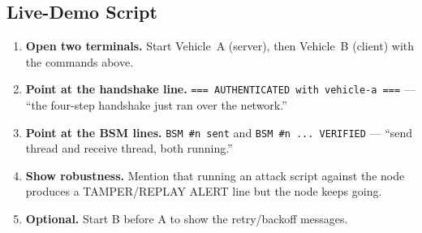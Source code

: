 \documentclass[11pt,a4paper]{article}
\begin{document}
\subsection{Live-Demo Script}
\begin{enumerate}
  \item \textbf{Open two terminals.} Start Vehicle~A (server), then Vehicle~B
        (client) with the commands above.
  \item \textbf{Point at the handshake line.} \texttt{=== AUTHENTICATED with
        vehicle-a ===} --- ``the four-step handshake just ran over the network.''
  \item \textbf{Point at the BSM lines.} \texttt{BSM \#n sent} and \texttt{BSM
        \#n ... VERIFIED} --- ``send thread and receive thread, both running.''
  \item \textbf{Show robustness.} Mention that running an attack script against
        the node produces a TAMPER/REPLAY ALERT line but the node keeps going.
  \item \textbf{Optional.} Start B before A to show the retry/backoff messages.
\end{enumerate}
\end{document}
